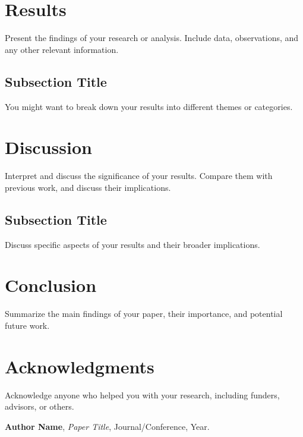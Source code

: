 \documentclass[11pt,a4paper]{article}
\begin{document}
	\section*{Results}
	Present the findings of your research or analysis. Include data, observations, and any other relevant information.
	
	\subsection*{Subsection Title}
	You might want to break down your results into different themes or categories.
	
	\section*{Discussion}
	Interpret and discuss the significance of your results. Compare them with previous work, and discuss their implications.
	
	\subsection*{Subsection Title}
	Discuss specific aspects of your results and their broader implications.
	
	\section*{Conclusion}
	Summarize the main findings of your paper, their importance, and potential future work.
	
	\section*{Acknowledgments}
	Acknowledge anyone who helped you with your research, including funders, advisors, or others.
	
	\begin{thebibliography}{9}
		\textbf{Author Name}, \textit{Paper Title}, Journal/Conference, Year.
	\end{thebibliography}
	
\end{document}
